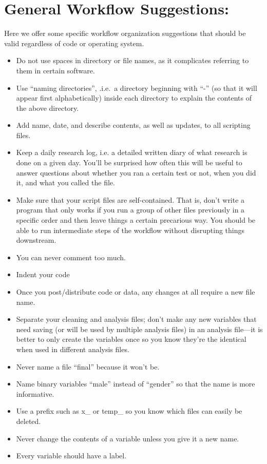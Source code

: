 \documentclass[12pt] {article}
\begin{document}
\section{General Workflow
Suggestions:}\label{general-workflow-suggestions}
Here we offer some specific workflow organization suggestions that should be valid regardless of code or operating system.
\begin{itemize}
\item
  Do not use spaces in directory or file names, as it complicates referring to them in certain software.
\item
  Use ``naming directories'', .i.e.~a directory beginning with ``-'' (so
  that it will appear first alphabetically) inside each directory to
  explain the contents of the above directory.
\item
  Add name, date, and describe contents, as well as updates, to all
  scripting files.
\item
  Keep a daily research log, i.e. a detailed written diary of what research is done on a given day. You'll be surprised how often this will be useful to answer questions about whether you ran a certain test or not, when you did it, and what you called the file.
  
\item
    Make sure that your script files are self-contained. That is, don't write a program that only works if you run a group of other files previously in a specific order and then leave things a certain precarious way. You should be able to run intermediate steps of the workflow without disrupting things downstream.
 
\item
  You can never comment too much.
\item
  Indent your code
\item
    Once you post/distribute code or data, any changes at all require a new file name.
\item
  Separate your cleaning and analysis files; don't make any new variables
  that need saving (or will be used by multiple analysis
  files) in an analysis file---it is better to only create the variables once so you know they're the identical when used in different analysis files.
\item
  Never name a file ``final'' because it won't be.
\item
  Name binary variables ``male'' instead of ``gender'' so that the name is more informative. 
\item
  Use a prefix such as x\_ or temp\_ so you know which files can easily
  be deleted.
\item
  Never change the contents of a variable unless you give it a new name.
\item
  Every variable should have a label.
\end{itemize}
\end{document}
